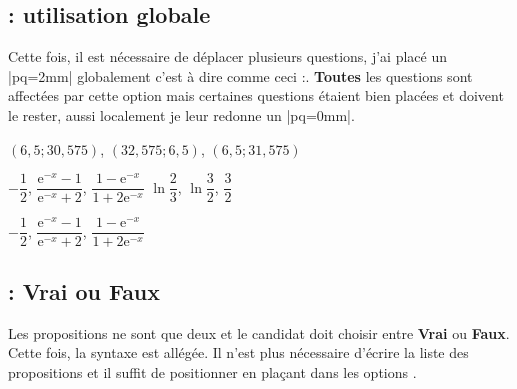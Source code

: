 \subsection{ : utilisation globale }

Cette fois, il est nécessaire de déplacer plusieurs questions, j'ai placé un |pq=2mm| globalement c'est à dire comme ceci :. \textbf{Toutes} les questions sont affectées par cette option mais certaines questions  étaient bien placées et doivent le rester, aussi localement je leur redonne un |pq=0mm|.

\medskip
\begin{alterqcm}[lq=85mm,pq=2mm]
{{$(6,5;30,575)$},
{$(32,575 ; 6,5)$},
{$(6,5 ; 31,575)$}}

{{$-\dfrac{1}{2}$},
{$\dfrac{\text{e}^{-x} - 1}{\text{e}^{-x} + 2}$},
{$\dfrac{1 - \text{e}^{-x}}{1 + 2\text{e}^{-x}}$}
}
{{$\ln \dfrac{2}{3}$},
{$\ln \dfrac{3}{2}$},
{$\dfrac{3}{2}$}
}
\end{alterqcm}

\begin{tkzexample}
 \begin{alterqcm}[lq=85mm,pq=2mm]
 {{$-\dfrac{1}{2}$},
 {$\dfrac{\text{e}^{-x} - 1}{\text{e}^{-x} + 2}$},
 {$\dfrac{1 - \text{e}^{-x}}{1 + 2\text{e}^{-x}}$}}
 \end{alterqcm}
\end{tkzexample}


\subsection{ : Vrai ou Faux}
Les propositions ne sont que  deux et le candidat doit choisir entre \textbf{Vrai} ou \textbf{Faux}. Cette fois, la syntaxe est allégée. Il n'est plus nécessaire d'écrire la liste des propositions et  il suffit de positionner   en plaçant dans les options   .


